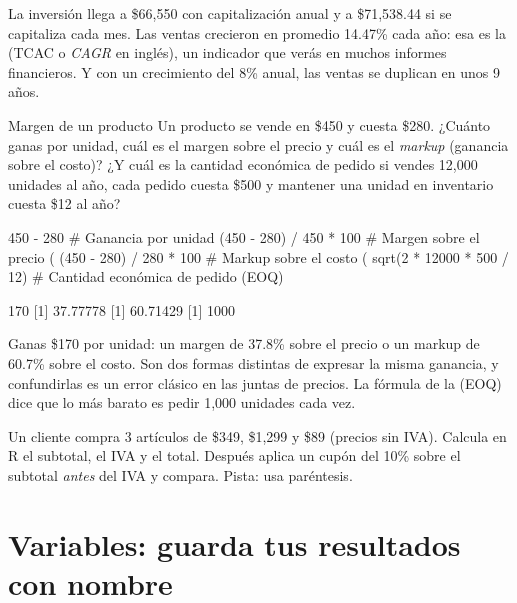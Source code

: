 La inversión llega a \$66,550 con capitalización anual y a \$71,538.44 si se
capitaliza cada mes. Las ventas crecieron en promedio 14.47\% cada año: esa
es la  (TCAC o
\emph{CAGR} en inglés), un indicador que verás en muchos informes
financieros. Y con un crecimiento del 8\% anual, las ventas se duplican en
unos 9 años.

\begin{ejemplo}{Margen de un producto}
Un producto se vende en \$450 y cuesta \$280. ¿Cuánto ganas por unidad,
cuál es el margen sobre el precio y cuál es el \emph{markup} (ganancia
sobre el costo)? ¿Y cuál es la cantidad económica de pedido si vendes
12,000 unidades al año, cada pedido cuesta \$500 y mantener una unidad en
inventario cuesta \$12 al año?
\end{ejemplo}

\begin{rcode}
450 - 280                        # Ganancia por unidad
(450 - 280) / 450 * 100          # Margen sobre el precio (%
(450 - 280) / 280 * 100          # Markup sobre el costo (%
sqrt(2 * 12000 * 500 / 12)       # Cantidad económica de pedido (EOQ)
\end{rcode}
\begin{rsalida}
[1] 170
[1] 37.77778
[1] 60.71429
[1] 1000
\end{rsalida}

Ganas \$170 por unidad: un margen de 37.8\% sobre el precio o un markup de
60.7\% sobre el costo. Son dos formas distintas de expresar la misma
ganancia, y confundirlas es un error clásico en las juntas de precios. La
fórmula de la  (EOQ) dice que lo más
barato es pedir 1,000 unidades cada vez.

\begin{hazlotu}
Un cliente compra 3 artículos de \$349, \$1,299 y \$89 (precios sin IVA).
Calcula en R el subtotal, el IVA y el total. Después aplica un cupón del
10\% sobre el subtotal \emph{antes} del IVA y compara. Pista: usa
paréntesis.
\end{hazlotu}

\section{Variables: guarda tus resultados con nombre}
\label{sec:m1-variables}

